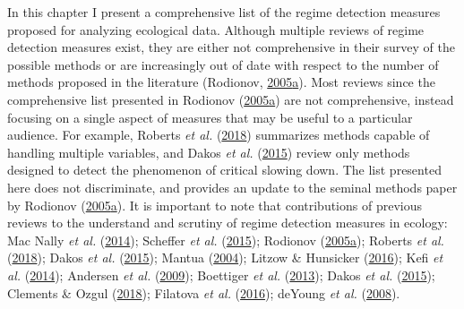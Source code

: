 \documentclass[12pt,twoside,openany]{reedthesis}
\begin{document}
In this chapter I present a comprehensive list of the regime detection measures proposed for analyzing ecological data. Although multiple reviews of regime detection measures exist, they are either not comprehensive in their survey of the possible methods or are increasingly out of date with respect to the number of methods proposed in the literature (Rodionov, \protect\hyperlink{ref-rodionov_brief_2005}{2005}\protect\hyperlink{ref-rodionov_brief_2005}{a}). Most reviews since the comprehensive list presented in Rodionov (\protect\hyperlink{ref-rodionov_brief_2005}{2005}\protect\hyperlink{ref-rodionov_brief_2005}{a}) are not comprehensive, instead focusing on a single aspect of measures that may be useful to a particular audience. For example, Roberts \emph{et al.} (\protect\hyperlink{ref-roberts2018early}{2018}) summarizes methods capable of handling multiple variables, and Dakos \emph{et al.} (\protect\hyperlink{ref-dakos2015resilience}{2015}) review only methods designed to detect the phenomenon of critical slowing down. The list presented here does not discriminate, and provides an update to the seminal methods paper by Rodionov (\protect\hyperlink{ref-rodionov_brief_2005}{2005}\protect\hyperlink{ref-rodionov_brief_2005}{a}). It is important to note that contributions of previous reviews to the understand and scrutiny of regime detection measures in ecology: Mac Nally \emph{et al.} (\protect\hyperlink{ref-mac2014scrutiny}{2014}); Scheffer \emph{et al.} (\protect\hyperlink{ref-scheffer2015generic}{2015}); Rodionov (\protect\hyperlink{ref-rodionov_brief_2005}{2005}\protect\hyperlink{ref-rodionov_brief_2005}{a}); Roberts \emph{et al.} (\protect\hyperlink{ref-roberts2018early}{2018}); Dakos \emph{et al.} (\protect\hyperlink{ref-dakos2015resilience}{2015}); Mantua (\protect\hyperlink{ref-mantua_methods_2004}{2004}); Litzow \& Hunsicker (\protect\hyperlink{ref-litzow_early_2016}{2016}); Kefi \emph{et al.} (\protect\hyperlink{ref-kefi2014early}{2014}); Andersen \emph{et al.} (\protect\hyperlink{ref-andersen_ecological_2009}{2009}); Boettiger \emph{et al.} (\protect\hyperlink{ref-boettiger_early_2013}{2013}); Dakos \emph{et al.} (\protect\hyperlink{ref-dakos2015resilience}{2015}); Clements \& Ozgul (\protect\hyperlink{ref-clements2018indicators}{2018}); Filatova \emph{et al.} (\protect\hyperlink{ref-filatova2016regime}{2016}); deYoung \emph{et al.} (\protect\hyperlink{ref-deyoung_regime_2008}{2008}).
\end{document}
